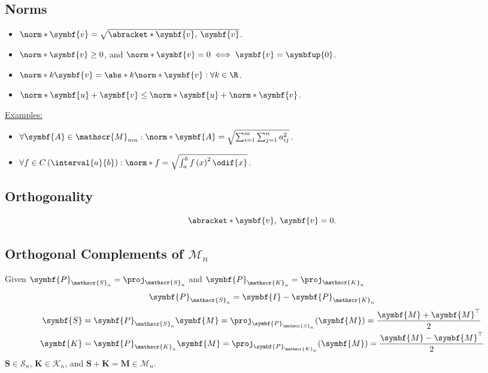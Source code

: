 \documentclass{article}
\begin{document}
\begin{multicols*}{3}
    \subsection{Norms}
    \begin{itemize}
        \item \(\norm*{\symbf{v}} = \sqrt{\abracket*{\symbf{v},\: \symbf{v}}}\).
        \item \(\norm*{\symbf{v}} \geq 0\), and \(\norm*{\symbf{v}} = 0 \iff \symbf{v} = \symbfup{0}\).
        \item \(\norm*{k \symbf{v}} = \abs*{k} \norm*{\symbf{v}} : \forall k \in \R\).
        \item \(\norm*{\symbf{u} + \symbf{v}} \leq \norm*{\symbf{u}} + \norm*{\symbf{v}}\).
    \end{itemize}
    \underline{Examples:}
    \begin{itemize}
        \item \(\forall \symbf{A} \in \mathscr{M}_{mn} : \norm*{\symbf{A}} = \sqrt{\sum_{i = 1}^m \sum_{j = 1}^n a_{ij}^2}\).
        \item \(\forall f \in C\left( \interval{a}{b} \right) : \norm*{f} = \sqrt{\int_a^b f\left( x \right)^2 \odif{x}}\).
    \end{itemize}
    \subsection{Orthogonality}
    \begin{equation*}
        \abracket*{\symbf{v},\: \symbf{v}} = 0.
    \end{equation*}
    \subsection{Orthogonal Complements of \texorpdfstring{\(\mathscr{M}_{n}\)}{Mn}}
    Given \(\symbf{P}_{\mathscr{S}_n} = \proj_{\mathscr{S}_n}\) and
    \(\symbf{P}_{\mathscr{K}_n} = \proj_{\mathscr{K}_n}\)
    \begin{equation*}
        \symbf{P}_{\mathscr{S}_n} = \symbf{I} - \symbf{P}_{\mathscr{K}_n}                                                                                                    \\
    \end{equation*}
    \begin{align*}
        \symbf{S} & = \symbf{P}_{\mathscr{S}_n} \symbf{M} = \proj_{\symbf{P}_{\mathscr{S}_n}}{\left( \symbf{M} \right)} = \frac{\symbf{M} + \symbf{M}^\top}{2} \\
        \symbf{K} & = \symbf{P}_{\mathscr{K}_n} \symbf{M} = \proj_{\symbf{P}_{\mathscr{K}_n}}{\left( \symbf{M} \right)} = \frac{\symbf{M} - \symbf{M}^\top}{2}
    \end{align*}
    \(\symbf{S} \in \mathscr{S}_n\), \(\symbf{K} \in \mathscr{K}_n\), and \(\symbf{S} + \symbf{K} = \symbf{M} \in \mathscr{M}_n\).

\end{multicols*}
\end{document}
